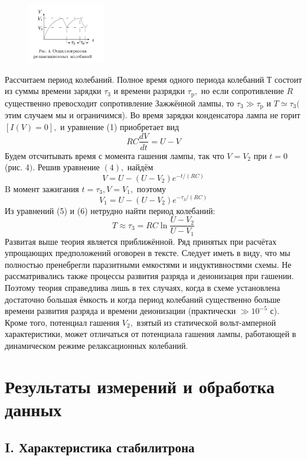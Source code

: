 \newpage

\begin{figure} 
\begin{center}
\includegraphics[width=0.3\textwidth]{4.PNG} 
\end{center}
\end{figure}

Рассчитаем период колебаний. Полное время одного периода колебаний Т состоит из суммы времени зарядки $\tau_{3}$ и времени разрядки $\tau_{\mathrm{p}},$ но если сопротивление $R$ существенно превосходит сопротивление Зажжённой лампы, то $\tau_{3} \gg \tau_{\mathrm{p}}$ и $T \simeq \tau_{3}($ этим случаем мы и ограничимся). Во время зарядки конденсатора лампа не горит $[I(V)=0],$ и уравнение (1) приобретает вид
$$
R C \frac{d V}{d t}=U-V
$$
Будем отсчитывать время с момента гашения лампы, так что $V=V_{2}$ при $t=0$ (рис. 4$) .$ Решив уравнение $(4),$ найдём
$$
V=U-\left(U-V_{2}\right) e^{-t /(R C)}
$$
$\mathrm{B}$ момент зажигания $t=\tau_{3}, V=V_{1},$ поэтому
$$
V_{1}=U-\left(U-V_{2}\right) e^{-\tau_{3} /(R C)}
$$
Из уравнений (5) и (6) нетрудно найти период колебаний:
$$
T \approx \tau_{3}=R C \ln \frac{U-V_{2}}{U-V_{1}}
$$
Развитая выше теория является приближённой. Ряд принятых при расчётах упрощающих предположений оговорен в тексте. Следует иметь в виду, что мы полностью пренебрегли паразитными емкостями и индуктивностями схемы. Не
рассматривались также процессы развития разряда и деионизация при гашении. Поэтому теория справедлива лишь в тех случаях, когда в схеме установлена достаточно большая ёмкость и когда период колебаний существенно больше времени развития разряда и времени деионизации (практически $\gg 10^{-5}$ с). Кроме того, потенциал гашения $V_{2},$ взятый из статической вольт-амперной характеристики, может отличаться от потенциала гашения лампы, работающей в динамическом режиме релаксационных колебаний.

\section{Результаты измерений и обработка данных}
\subsection*{ I. Характеристика стабилитрона}

